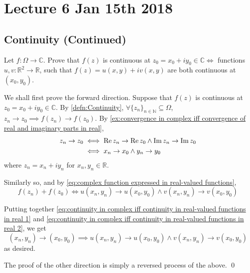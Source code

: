 \documentclass[11pt, oneside]{book}
\begin{document}

\chapter{Lecture 6 Jan 15th 2018}
	\label{chapter:lecture_6_jan_15th_2018}

\section{Continuity (Continued)} %
\label{sec:continuity}

\begin{ex}\label{ex:continuity in complex iff continuity in real-valued functions in real}
	Let $f: \Omega \to \mathbb{C}$. Prove that $f(z)$ is continuous at $z_0 = x_0 + iy_0 \in \mathbb{C} \iff$ functions $u, v: \mathbb{R}^2 \to \mathbb{R}$, such that $f(z) = u(x, y) + iv(x,y)$ are both continuous at $(x_0, y_0)$.

	\begin{solution}
		We shall first prove the forward direction. Suppose that $f(z)$ is continuous at $z_0 = x_0 + iy_0 \in \mathbb{C}$. By \cref{defn:Continuity}, $\forall \{z_n\}_{n \in \mathbb{N}} \subseteq \Omega$, $z_n \to z_0 \implies f(z_n) \to f(z_0)$. By \cref{ex:convergence in complex iff convergence of real and imaginary parts in real},
		\begin{align}
			z_n \to z_0 &\iff \operatorname{Re} z_n \to \operatorname{Re} z_0 \land \operatorname{Im} z_n \to \operatorname{Im} z_0 \nonumber \\
				&\iff x_n \to x_0 \land y_n \to y_0 \label{eq:continuity in complex iff continuity in real-valued functions in real 1}
		\end{align}
		where $z_n = x_n + iy_n$ for $x_n, y_n \in \mathbb{R}$.

		Similarly so, and by \cref{eq:complex function expressed in real-valued functions},
		\begin{equation}\label{eq:continuity in complex iff continuity in real-valued functions in real 2}
			f(z_n) + f(z_0) \iff u(x_n, y_n) \to u(x_0, y_0) \land v(x_n, y_n) \to v(x_0, y_0)
		\end{equation}

		Putting together \cref{eq:continuity in complex iff continuity in real-valued functions in real 1} and \cref{eq:continuity in complex iff continuity in real-valued functions in real 2}, we get
		\begin{equation*}
			(x_n, y_n) \to (x_0, y_0) \implies u(x_n, y_n) \to u(x_0, y_0) \land v(x_n, y_n) \to v(x_0, y_0)
		\end{equation*}
		as desired.

		The proof of the other direction is simply a reversed process of the above. \qed
	\end{solution}
\end{ex}
\end{document}
